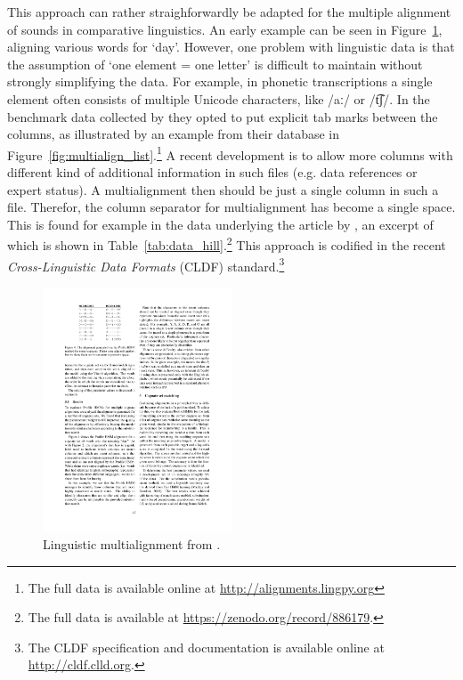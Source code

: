 \documentclass[11pt]{article}
\begin{document}
This approach can rather straighforwardly be adapted for the multiple alignment of sounds in comparative linguistics. An early example can be seen in Figure~\ref{fig:multialign_bhargava}, aligning various words for `day'. However, one problem with linguistic data is that the assumption of `one element = one letter' is difficult to maintain without strongly simplifying the data. For example, in phonetic transcriptions a single element often consists of multiple Unicode characters, like /aː/ or /t͡ʃ/. In the benchmark data collected by \textcite{list2014benchmark} they opted to put explicit tab marks between the columns, as illustrated by an example from their database in Figure~\ref{fig:multialign_list}.\footnote{The full data is available online at \url{http://alignments.lingpy.org}} A recent development is to allow more columns with different kind of additional information in such files (e.g. data references or expert status). A multialignment then should be just a single column in such a file. Therefor, the column separator for multialignment has become a single space. This is found for example in the data underlying the article by \textcite{hill2017}, an excerpt of which is shown in Table~\ref{tab:data_hill}.\footnote{The full data is available at \url{https://zenodo.org/record/886179}.} This approach is codified in the recent \textit{Cross-Linguistic Data Formats} (CLDF) standard.\footnote{The CLDF specification and documentation is available online at \url{http://cldf.clld.org}.}

\begin{figure}[htbp]
  \centering
  \includegraphics[width=0.5\textwidth]{images/multialign_bhargava.pdf}
  \caption{Linguistic multialignment from \textcite[47]{bhargava2009}.}
  \label{fig:multialign_bhargava}
\end{figure}
\end{document}
